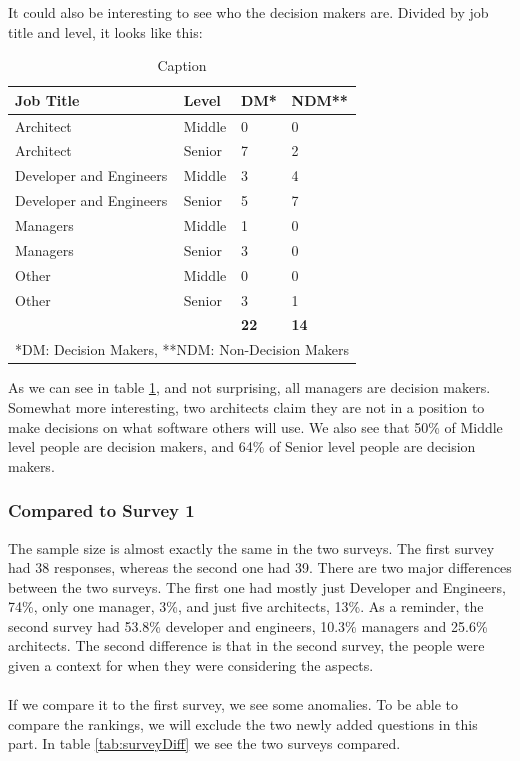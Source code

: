 \documentclass{article}
\begin{document}
It could also be interesting to see who the decision makers are. Divided
by job title and level, it looks like this:

\begin{table}[H]
\centering
\begin{tabular}{l l l l}
\textbf{Job Title} & \textbf{Level} & \textbf{DM*} & \textbf{NDM**} \\ \hline
Architect               & Middle & 0               & 0                   \\
Architect               & Senior & 7               & 2                   \\ \hline
Developer and Engineers & Middle & 3               & 4                   \\
Developer and Engineers & Senior & 5               & 7                   \\ \hline
Managers                & Middle & 1               & 0                   \\
Managers                & Senior & 3               & 0                   \\ \hline
Other                   & Middle & 0               & 0                   \\
Other                   & Senior & 3               & 1                   \\ \hdashline
&        &     \textbf{22}          & \textbf{14}              \\ \hline\hline
\multicolumn{4}{l}{*DM: Decision Makers, **NDM: Non-Decision Makers}

\end{tabular}
\caption{Caption}
\label{tab:level}
\end{table}
As we can see in table \ref{tab:level}, and not surprising, all managers are decision makers.
Somewhat more interesting, two architects claim they are not in a
position to make decisions on what software others will use. We also see
that 50\% of Middle level people are decision makers, and 64\% of Senior
level people are decision makers.


\subsubsection{Compared to Survey 1}

The sample size is almost exactly the same in the two surveys. The first
survey had 38 responses, whereas the second one had 39. There are two
major differences between the two surveys. The first one had mostly just
Developer and Engineers, 74\%, only one manager, 3\%, and just five
architects, 13\%. As a reminder, the second survey had 53.8\% developer
and engineers, 10.3\% managers and 25.6\% architects. The second
difference is that in the second survey, the people were given a context
for when they were considering the aspects.
\\ \\
If we compare it to the first survey, we see some anomalies. To be able
to compare the rankings, we will exclude the two newly added questions
in this part. In table \ref{tab:surveyDiff} we see the two surveys compared.
\end{document}
